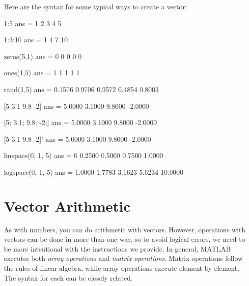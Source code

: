 \documentclass[../../book.tex]{subfiles}
\begin{document}
Here are the syntax for some typical ways to create a vector:
\begin{code}
     1:5
     ans =
          1     2     3     4     5

     1:3:10
     ans =
          1     4     7    10

     zeros(5,1)
     ans =
          0
          0
          0
          0
          0

     ones(1,5)
     ans =
          1     1     1     1     1

     rand(1,5)
     ans =
         0.1576    0.9706    0.9572    0.4854    0.8003

     [5 3.1 9.8 -2]
     ans =
         5.0000    3.1000    9.8000   -2.0000

     [5; 3.1; 9.8; -2;]
     ans =
         5.0000
         3.1000
         9.8000
        -2.0000

     [5 3.1 9.8 -2]'
     ans =
         5.0000
         3.1000
         9.8000
        -2.0000

     linspace(0, 1, 5)
     ans =
            0    0.2500    0.5000    0.7500    1.0000
        
     logspace(0, 1, 5)
     ans =
       1.0000    1.7783    3.1623    5.6234   10.0000
\end{code}


\section{Vector Arithmetic}
\label{elementwise}


As with numbers, you can do arithmetic with vectors.  However, operations with vectors can be done in more than one way, so to avoid logical errors, we need to be more intentional with the instructions we provide.  In general, MATLAB executes both \emph{array operations} and \emph{matrix operations}.   Matrix operations follow the rules of linear algebra, while array operations execute element by element.  The syntax for each can be closely related.
\end{document}
